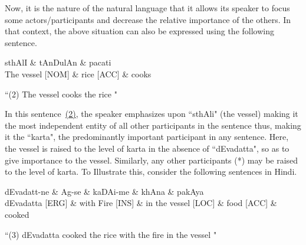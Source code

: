 \documentclass[twoside]{article}
\begin{document}
Now, it is the nature of the natural language that it allows its speaker to focus some actors/participants and decrease the relative importance of the others. In that context, the above situation can also be expressed using the following sentence.

\hypertarget{fig2}{}
\begin{center}
\begin{dependency}[arc edge, arc angle=80, text only label, label style={above}]
   \begin{deptext}[column sep=1em]
      sthAlI \& tAnDulAn \& pacati \\
      The vessel [NOM] \& rice [ACC]  \& cooks \\
   \end{deptext}
   
\end{dependency} 

 ``(2) The vessel cooks the rice " 
\end{center}
In this sentence~\hyperlink{fig2}{(2)}, the speaker emphasizes upon ``sthAli" (the vessel) making it the most independent entity of all other participants in the sentence thus, making it the ``karta", the predominantly important participant in any sentence.
Here, the vessel is raised to the level of karta in the absence of ``dEvadatta", so as to give importance to the vessel.
Similarly, any other participants (*) may be raised to the level of karta.
To Illustrate this, consider the following sentences in Hindi.

\hypertarget{fig3}{}
\begin{center}
\begin{dependency}[arc edge, arc angle=80, text only label, label style={above}]
   \begin{deptext}[column sep=1em]
      dEvadatt-ne \& Ag-se \& kaDAi-me \& khAna \& pakAya \\
      dEvadatta [ERG] \& with Fire [INS] \& in the vessel [LOC] \& food [ACC]  \& cooked \\
   \end{deptext}
\end{dependency} 

 ``(3) dEvadatta cooked the rice with the fire in the vessel " 
 

\end{center}
\end{document}
